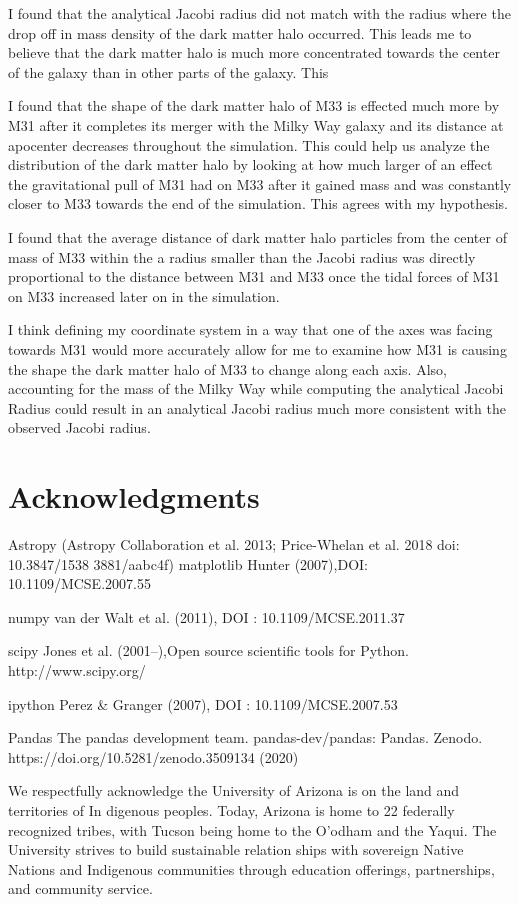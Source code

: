 \documentclass[fleqn,usenatbib]{mnras}
\begin{document}
    I found that the analytical Jacobi radius did not match with the radius where the drop off in mass density of the dark matter halo occurred. This leads me to believe that the dark matter halo is much more concentrated towards the center of the galaxy than in other parts of the galaxy. This 

    I found that the shape of the dark matter halo of M33 is effected much more by M31 after it completes its merger with the Milky Way galaxy and its distance at apocenter decreases throughout the simulation. This could help  us analyze the distribution of the dark matter halo by looking at how much larger of an effect the gravitational pull of M31 had on M33 after it gained mass and was constantly closer to M33 towards the end of the simulation. This agrees with my hypothesis.

    I found that the average distance of dark matter halo particles from the center of mass of M33 within the a radius smaller than the Jacobi radius was directly proportional to the distance between M31 and M33 once the tidal forces of M31 on M33 increased later on in the simulation.

    I think defining my coordinate system in a way that one of the axes was facing towards M31 would more accurately allow for me to examine how M31 is causing the shape the dark matter halo of M33 to change along each axis. Also, accounting for the mass of the Milky Way while computing the analytical Jacobi Radius could result in an analytical Jacobi radius much more consistent with the observed Jacobi radius.

\section{Acknowledgments}

Astropy (Astropy Collaboration et al. 2013; Price-Whelan et al. 2018 doi: 10.3847/1538
3881/aabc4f)
matplotlib Hunter (2007),DOI: 10.1109/MCSE.2007.55

numpy van der Walt et al. (2011), DOI : 10.1109/MCSE.2011.37

scipy Jones et al. (2001–),Open source scientific tools for Python. http://www.scipy.org/

ipython Perez \& Granger (2007), DOI : 10.1109/MCSE.2007.53

Pandas The pandas development team. pandas-dev/pandas: Pandas. Zenodo. https://doi.org/10.5281/zenodo.3509134 (2020)

We respectfully acknowledge the University of Arizona is on the land and territories of In
digenous peoples. Today, Arizona is home to 22 federally recognized tribes, with Tucson being
 home to the O’odham and the Yaqui. The University strives to build sustainable relation
ships with sovereign Native Nations and Indigenous communities through education offerings,
 partnerships, and community service.


 
\cite{}
\label{lastpage}
\end{document}
